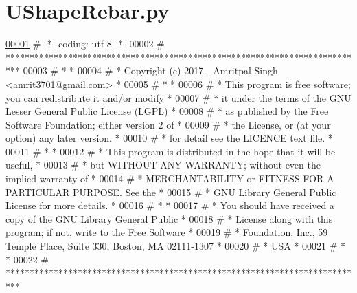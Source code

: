 \hypertarget{UShapeRebar_8py_source}{}\section{U\+Shape\+Rebar.\+py}

\begin{DoxyCode}
\hypertarget{UShapeRebar_8py_source.tex_l00001}{}\hyperlink{namespaceUShapeRebar}{00001} \textcolor{comment}{# -*- coding: utf-8 -*-}
00002 \textcolor{comment}{# ***************************************************************************}
00003 \textcolor{comment}{# *                                                                         *}
00004 \textcolor{comment}{# *   Copyright (c) 2017 - Amritpal Singh <amrit3701@gmail.com>             *}
00005 \textcolor{comment}{# *                                                                         *}
00006 \textcolor{comment}{# *   This program is free software; you can redistribute it and/or modify  *}
00007 \textcolor{comment}{# *   it under the terms of the GNU Lesser General Public License (LGPL)    *}
00008 \textcolor{comment}{# *   as published by the Free Software Foundation; either version 2 of     *}
00009 \textcolor{comment}{# *   the License, or (at your option) any later version.                   *}
00010 \textcolor{comment}{# *   for detail see the LICENCE text file.                                 *}
00011 \textcolor{comment}{# *                                                                         *}
00012 \textcolor{comment}{# *   This program is distributed in the hope that it will be useful,       *}
00013 \textcolor{comment}{# *   but WITHOUT ANY WARRANTY; without even the implied warranty of        *}
00014 \textcolor{comment}{# *   MERCHANTABILITY or FITNESS FOR A PARTICULAR PURPOSE.  See the         *}
00015 \textcolor{comment}{# *   GNU Library General Public License for more details.                  *}
00016 \textcolor{comment}{# *                                                                         *}
00017 \textcolor{comment}{# *   You should have received a copy of the GNU Library General Public     *}
00018 \textcolor{comment}{# *   License along with this program; if not, write to the Free Software   *}
00019 \textcolor{comment}{# *   Foundation, Inc., 59 Temple Place, Suite 330, Boston, MA  02111-1307  *}
00020 \textcolor{comment}{# *   USA                                                                   *}
00021 \textcolor{comment}{# *                                                                         *}
00022 \textcolor{comment}{# ***************************************************************************}

\end{DoxyCode}
